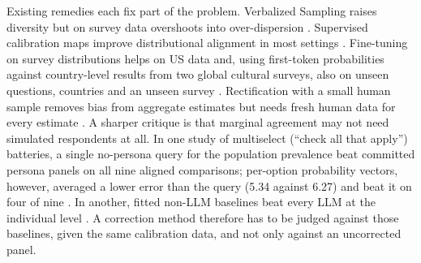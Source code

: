 \documentclass[11pt]{article}
\begin{document}
Existing remedies each fix part of the problem. Verbalized Sampling raises diversity \citep{zhang2025verbalized} but on survey data overshoots into over-dispersion \citep{ozkan2026distribution}. Supervised calibration maps improve distributional alignment in most settings \citep{kambhatla2025supervision}. Fine-tuning on survey distributions helps on US data \citep{suh2025subpop} and, using first-token probabilities against country-level results from two global cultural surveys, also on unseen questions, countries and an unseen survey \citep{cao2025specializing}. Rectification with a small human sample removes bias from aggregate estimates but needs fresh human data for every estimate \citep{krsteski2025valid}. A sharper critique is that marginal agreement may not need simulated respondents at all. In one study of multiselect (``check all that apply'') batteries, a single no-persona query for the population prevalence beat committed persona panels on all nine aligned comparisons; per-option probability vectors, however, averaged a lower error than the query (5.34 against 6.27) and beat it on four of nine \citep{doudkin2026marginal}. In another, fitted non-LLM baselines beat every LLM at the individual level \citep{chen2026synthetic}. A correction method therefore has to be judged against those baselines, given the same calibration data, and not only against an uncorrected panel.
\end{document}
